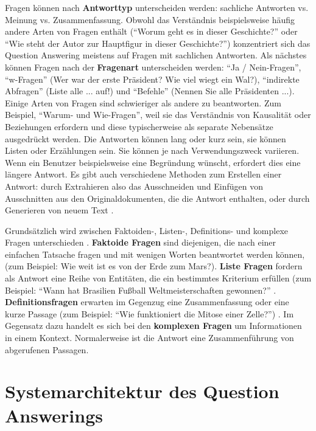 \documentclass[
        ngerman,
        paper=a4,
        numbers=noendperiod,
]{scrreprt}
\begin{document}
Fragen können nach \textbf{Antworttyp} unterscheiden werden: sachliche Antworten vs. Meinung vs. Zusammenfassung. Obwohl das Verständnis beispielsweise häufig andere Arten von Fragen enthält (\enquote{Worum geht es in dieser Geschichte?} oder \enquote{Wie steht der Autor zur Hauptfigur in dieser Geschichte?}) konzentriert sich das Question Answering meistens auf Fragen mit sachlichen Antworten. Als nächstes können Fragen nach der \textbf{Fragenart} unterscheiden werden: \enquote{Ja / Nein-Fragen}, \enquote{w-Fragen} (Wer war der erste Präsident? Wie viel wiegt ein Wal?), \enquote{indirekte Abfragen} (Liste alle ... auf!) und \enquote{Befehle} (Nennen Sie alle Präsidenten ...). Einige Arten von Fragen sind schwieriger als andere zu beantworten. Zum Beispiel, \enquote{Warum- und Wie-Fragen}, weil sie das Verständnis von Kausalität oder Beziehungen erfordern und diese typischerweise als separate Nebensätze ausgedrückt werden. Die Antworten können lang oder kurz sein, sie können Listen oder Erzählungen sein. Sie können je nach Verwendungszweck variieren. Wenn ein Benutzer beispielsweise eine Begründung wünscht, erfordert dies eine längere Antwort. Es gibt auch verschiedene Methoden zum Erstellen einer Antwort: durch Extrahieren also das Ausschneiden und Einfügen von Ausschnitten aus den Originaldokumenten, die die Antwort enthalten, oder durch Generieren von neuem Text \citep [S. 277-278]{Hirschman2001NaturalHere}. 

Grundsätzlich wird zwischen Faktoiden-, Listen-, Definitions- und komplexe Fragen unterschieden \citep{Kolomiyets2011APerspective}. \textbf{Faktoide Fragen} sind diejenigen, die nach einer einfachen Tatsache fragen und mit wenigen Worten beantwortet werden können, (zum Beispiel: Wie weit ist es von der Erde zum Mars?). \textbf{Liste Fragen} fordern als Antwort eine Reihe von Entitäten, die ein bestimmtes Kriterium erfüllen (zum Beispiel: \enquote{Wann hat Brasilien Fußball Weltmeisterschaften gewonnen?} \citep{Heie2012QuestionModelling}. \textbf{Definitionsfragen} erwarten im Gegenzug eine Zusammenfassung oder eine kurze Passage (zum Beispiel: \enquote{Wie funktioniert die Mitose einer Zelle?}) \citep{Neves2015QuestionBiology}. Im Gegensatz dazu handelt es sich bei den \textbf{komplexen Fragen} um Informationen in einem Kontext. Normalerweise ist die Antwort eine Zusammenführung von abgerufenen Passagen.


\section{Systemarchitektur des Question Answerings} %
\end{document}
